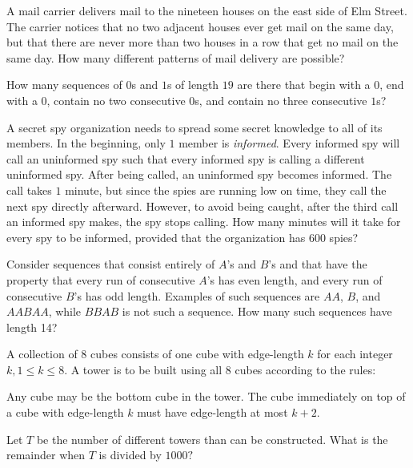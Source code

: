\documentclass[11pt]{article}
\begin{document}
\begin{prob}[AIME I 2001/14]{3}
A mail carrier delivers mail to the nineteen houses on the east side of Elm Street. The carrier notices that no two adjacent houses ever get mail on the same day, but that there are never more than two houses in a row that get no mail on the same day. How many different patterns of mail delivery are possible?
\end{prob}

\begin{prob}[AMC 12B 2019/23]{3}
How many sequences of $0$s and $1$s of length $19$ are there that begin with a $0$, end with a $0$, contain no two consecutive $0$s, and contain no three consecutive $1$s?
\end{prob}

\begin{prob}{3}
A secret spy organization needs to spread some secret knowledge to all of its members. In the beginning, only $1$ member is \textit{informed}. Every informed spy will call an uninformed spy such that every informed spy is calling a different uninformed spy. After being called, an uninformed spy becomes informed. The call takes $1$ minute, but since the spies are running low on time, they call the next spy directly afterward. However, to avoid being caught, after the third call an informed spy makes, the spy stops calling. How many minutes will it take for every spy to be informed, provided that the organization has $600$ spies?
\end{prob}


\begin{prob}[AIME 2008 I/11]{3}
Consider sequences that consist entirely of $ A$'s and $ B$'s and that have the property that every run of consecutive $ A$'s has even length, and every run of consecutive $ B$'s has odd length. Examples of such sequences are $ AA$, $ B$, and $ AABAA$, while $ BBAB$ is not such a sequence. How many such sequences have length 14?
\end{prob}


\begin{prob}[AIME I 2006/11]{3}

A collection of $8$ cubes consists of one cube with edge-length $k$ for each integer $k, 1 \le k \le 8.$ A tower is to be built using all $8$ cubes according to the rules:
\begin{itemize}
    \Item Any cube may be the bottom cube in the tower.
    \Item The cube immediately on top of a cube with edge-length $k$ must have edge-length at most $k+2.$
\end{itemize}
Let $T$ be the number of different towers than can be constructed. What is the remainder when $T$ is divided by $1000?$
\end{prob}
\end{document}

